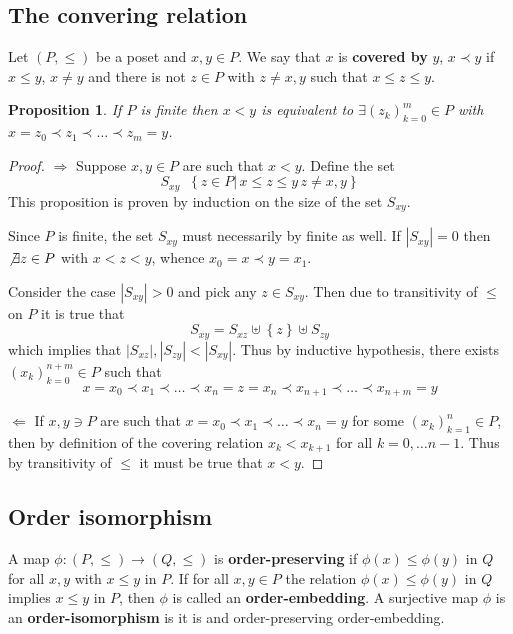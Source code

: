 \documentclass[a4paper]{article}
\newcommand{\obj}[1]{{\left\{ #1 \right \}}}
\newcommand{\brac}[1]{{\left ( #1 \right )}}
\newcommand{\induc}[1]{{\left . #1 \right \vert}}
\newcommand{\abs}[1]{{\left | #1 \right |}}
\newtheorem{prop}{Proposition}
\newcommand{\defn}{\mathop{\overset{\Delta}{=}}\nolimits}
\begin{document}
\subsection{The convering relation} %
\label{sub:the_convering_relation}

Let $(P,\leq)$ be a poset and $x, y\in P$. We say that $x$ is \textbf{covered by} $y$, $x\prec y$ if $x\leq y$, $x\neq y$ and there is not $z\in P$ with $z\neq x, y$ such that $x \leq z \leq y$.

\begin{prop} If $P$ is finite then $x<y$ is equivalent to $\exists \brac{z_k}_{k=0}^m\in P$ with $x = z_0\prec z_1\prec \ldots \prec z_m = y$.
\end{prop}

\begin{proof}
$\Rightarrow$ Suppose $x,y\in P$ are such that $x<y$. Define the set \[S_{xy}\defn \obj{\induc{z\in P}\,x \leq z \leq y\,z\neq x,y}\] This proposition is proven by induction on the size of the set $S_{xy}$.

Since $P$ is finite, the set $S_{xy}$ must necessarily by finite as well. If $\abs{S_{xy}} = 0$ then $\not\exists z\in P$ with $x<z<y$, whence $x_0 = x\prec y = x_1$.

Consider the case $\abs{S_{xy}}>0$ and pick any $z\in S_{xy}$. Then due to transitivity of $\leq$ on $P$ it is true that \[S_{xy} = S_{xz}\uplus \obj{z}\uplus S_{zy}\] which implies that $\abs{S_{xz}},\abs{S_{zy}}<\abs{S_{xy}}$. Thus by inductive hypothesis, there exists $\brac{x_k}_{k=0}^{n+m}\in P$ such that \[x = x_0 \prec x_1 \prec \ldots \prec x_n = z = x_n \prec x_{n+1} \prec \ldots \prec x_{n+m} = y\]

$\Leftarrow$ If $x,y\ni P$ are such that $x = x_0 \prec x_1 \prec \ldots \prec x_n = y$ for some $\brac{x_k}_{k=1}^n\in P$, then by definition of the covering relation $x_k<x_{k+1}$ for all $k=0,\ldots {n-1}$. Thus by transitivity of $\leq$ it must be true that $x<y$.

\end{proof}


\subsection{Order isomorphism} %
\label{sub:order_isomorphism}

A map $\phi:(P,\leq)\to (Q,\leq)$ is \textbf{order-preserving} if $\phi(x)\leq \phi(y)$ in $Q$ for all $x,y$ with $x\leq y$ in $P$. If for all $x,y\in P$ the relation $\phi(x)\leq \phi(y)$ in $Q$ implies $x\leq y$ in $P$, then $\phi$ is called an \textbf{order-embedding}. A surjective map $\phi$ is an \textbf{order-isomorphism} is it is and order-preserving order-embedding.
\end{document}
